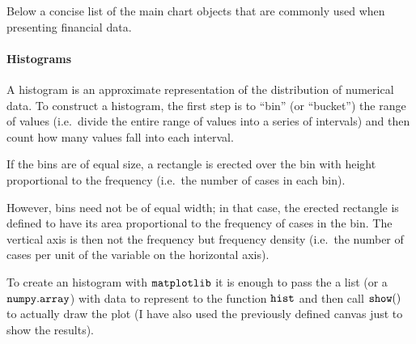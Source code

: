 Below a concise list of the main chart objects that are commonly used
when presenting financial data.

\hypertarget{histograms}{%
\paragraph{Histograms}\label{histograms}}

A histogram is an approximate representation of the distribution of
numerical data. To construct a histogram, the first step is to ``bin''
(or ``bucket'') the range of values (i.e.~divide the entire range of
values into a series of intervals) and then count how many values fall
into each interval.

If the bins are of equal size, a rectangle is erected over the bin with
height proportional to the frequency (i.e.~the number of cases in each
bin).

However, bins need not be of equal width; in that case, the erected
rectangle is defined to have its area proportional to the frequency of
cases in the bin. The vertical axis is then not the frequency but
frequency density (i.e.~the number of cases per unit of the variable on
the horizontal axis).

To create an histogram with \(\tt{matplotlib}\) it is enough to pass the
a list (or a \(\tt{numpy.array}\)) with data to represent to the
function \(\tt{hist}\) and then call \(\tt{show()}\) to actually draw
the plot (I have also used the previously defined canvas just to show
the results).


